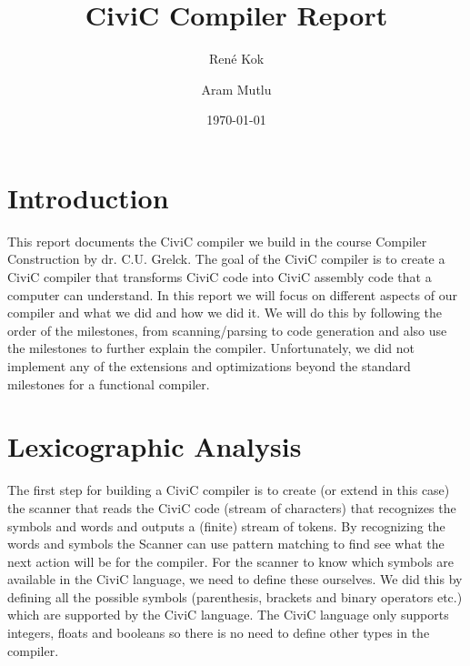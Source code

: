 \documentclass{uva-inf-article}
\title{CiviC Compiler Report}
\author{René Kok}
\author{Aram Mutlu}
\date{\today}
\begin{document}
\maketitle
\newpage


\tableofcontents
\begin{abstract}
\end{abstract}
\newpage


\section{Introduction}
\par This report documents the CiviC compiler we build in 
the course Compiler Construction by dr. C.U. Grelck. The goal of the CiviC compiler 
is to create a CiviC compiler that transforms CiviC code into CiviC assembly code 
that a computer can understand. In this report we will focus on different aspects 
of our compiler and what we did and how we did it. We will do this by following the order of the milestones,
from scanning/parsing to code generation and also use the milestones to further 
explain the compiler. Unfortunately, we did not implement any of the extensions and optimizations beyond the standard 
milestones for a functional compiler.

\newpage
\section{Lexicographic Analysis}
The first step for building a CiviC compiler is to create (or extend in this case) 
the scanner that reads the CiviC code (stream of characters) that recognizes the 
symbols and words and outputs a (finite) stream of tokens.
By recognizing the words and symbols the Scanner can use pattern matching to find see
what the next action will be for the compiler. For the scanner to know which symbols
are available in the CiviC language, we need to define these ourselves. We did this 
by defining all the possible symbols (parenthesis, brackets and binary operators etc.)
which are supported by the CiviC language. The CiviC language only supports integers,
floats and booleans so there is no need to define other types in the compiler.
\end{document}
